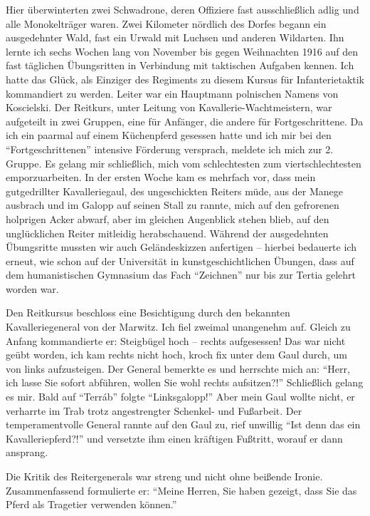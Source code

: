 Hier überwinterten zwei Schwadrone, deren Offiziere fast ausschließlich adlig und alle Monokelträger waren. Zwei Kilometer nördlich des Dorfes begann ein ausgedehnter Wald, fast ein Urwald mit Luchsen und anderen Wildarten. Ihn lernte ich sechs Wochen lang von November bis gegen Weihnachten 1916 auf den fast täglichen Übungsritten in Verbindung mit taktischen Aufgaben kennen. Ich hatte das Glück, als Einziger des Regiments zu diesem Kursus für Infanterietaktik kommandiert zu werden. Leiter war ein Hauptmann polnischen Namens von Koscielski. Der Reitkurs, unter Leitung von Kavallerie-Wachtmeistern, war aufgeteilt in zwei Gruppen, eine für Anfänger, die andere für Fortgeschrittene. Da ich ein paarmal auf einem Küchenpferd gesessen hatte und ich mir bei den \enquote{Fortgeschrittenen} intensive Förderung versprach, meldete ich mich zur 2. Gruppe. Es gelang mir schließlich, mich vom schlechtesten zum viertschlechtesten emporzuarbeiten. In der ersten Woche kam es mehrfach vor, dass mein gutgedrillter Kavalleriegaul, des ungeschickten Reiters müde, aus der Manege ausbrach und im Galopp auf seinen Stall zu rannte, mich auf den gefrorenen holprigen Acker abwarf, aber im gleichen Augenblick stehen blieb, auf den unglücklichen Reiter mitleidig herabschauend. Während der ausgedehnten Übungsritte mussten wir auch Geländeskizzen anfertigen -- hierbei bedauerte ich erneut, wie schon auf der Universität in kunstgeschichtlichen Übungen, dass auf dem humanistischen Gymnasium das Fach \enquote{Zeichnen} nur bis zur Tertia gelehrt worden war.

Den Reitkursus beschloss eine Besichtigung durch den bekannten Kavalleriegeneral von der Marwitz. Ich fiel zweimal unangenehm auf. Gleich zu Anfang kommandierte er: Steigbügel hoch -- rechts aufgesessen! Das war nicht geübt worden, ich kam rechts nicht hoch, kroch fix unter dem Gaul durch, um von links aufzusteigen. Der General bemerkte es und herrschte mich an: \enquote{Herr, ich lasse Sie sofort abführen, wollen Sie wohl rechts aufsitzen?!} Schließlich gelang es mir. Bald auf \enquote{Terráb} folgte \enquote{Linksgalopp!} Aber mein Gaul wollte nicht, er verharrte im Trab trotz angestrengter Schenkel- und Fußarbeit. Der temperamentvolle General rannte auf den Gaul zu, rief unwillig \enquote{Ist denn das ein Kavalleriepferd?!} und versetzte ihm einen kräftigen Fußtritt, worauf er dann ansprang.

Die Kritik des Reitergenerals war streng und nicht ohne beißende Ironie. Zusammenfassend formulierte er: \enquote{Meine Herren, Sie haben gezeigt, dass Sie das Pferd als Tragetier verwenden können.}

